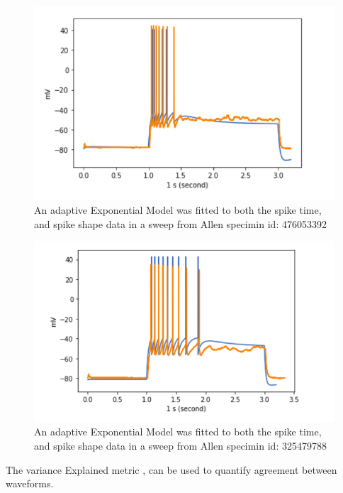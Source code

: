 \begin{figure}
    \centering
    \includegraphics[]{figures/adexp_fit_allen_spec_id_476053392.png}
    \caption{An adaptive Exponential Model was fitted to both the spike time, and spike shape data in a sweep from Allen specimin id: 476053392}        \label{fig:mutispiking fit specimen 476053392}

\end{figure}

\begin{figure}
    \centering
    \includegraphics[]{figures/adexp_fit_allen_specid_325479788.png}
    \caption{An adaptive Exponential Model was fitted to both the spike time, and spike shape data in a sweep from Allen specimin id: 325479788}
    \label{fig:mutispiking fit specimen 325479788}
\end{figure}

The variance Explained metric \cite{gouwens2018systematic}, can be used to quantify agreement between waveforms.

